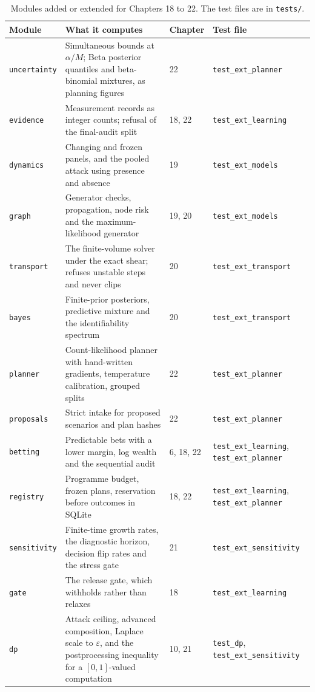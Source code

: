 \begin{table}[ht]
\centering\small
\caption{Modules added or extended for Chapters 18 to 22. The test files are in \texttt{tests/}.}
\label{app:tab-ext}
\begin{tabular}{p{2.1cm}p{6.0cm}p{1.7cm}p{3.0cm}}
\toprule
Module & What it computes & Chapter & Test file\\
\midrule
\texttt{uncertainty} & Simultaneous bounds at $\alpha/M$; Beta posterior quantiles and beta-binomial mixtures, as planning figures & 22 & \texttt{test\_ext\_planner}\\
\texttt{evidence} & Measurement records as integer counts; refusal of the final-audit split & 18, 22 & \texttt{test\_ext\_learning}\\
\texttt{dynamics} & Changing and frozen panels, and the pooled attack using presence and absence & 19 & \texttt{test\_ext\_models}\\
\texttt{graph} & Generator checks, propagation, node risk and the maximum-likelihood generator & 19, 20 & \texttt{test\_ext\_models}\\
\texttt{transport} & The finite-volume solver under the exact shear; refuses unstable steps and never clips & 20 & \texttt{test\_ext\_transport}\\
\texttt{bayes} & Finite-prior posteriors, predictive mixture and the identifiability spectrum & 20 & \texttt{test\_ext\_transport}\\
\texttt{planner} & Count-likelihood planner with hand-written gradients, temperature calibration, grouped splits & 22 & \texttt{test\_ext\_planner}\\
\texttt{proposals} & Strict intake for proposed scenarios and plan hashes & 22 & \texttt{test\_ext\_planner}\\
\texttt{betting} & Predictable bets with a lower margin, log wealth and the sequential audit & 6, 18, 22 & \texttt{test\_ext\_learning}, \texttt{test\_ext\_planner}\\
\texttt{registry} & Programme budget, frozen plans, reservation before outcomes in SQLite & 18, 22 & \texttt{test\_ext\_learning}, \texttt{test\_ext\_planner}\\
\texttt{sensitivity} & Finite-time growth rates, the diagnostic horizon, decision flip rates and the stress gate & 21 & \texttt{test\_ext\_sensitivity}\\
\texttt{gate} & The release gate, which withholds rather than relaxes & 18 & \texttt{test\_ext\_learning}\\
\texttt{dp} & Attack ceiling, advanced composition, Laplace scale to $\varepsilon$, and the postprocessing inequality for a $[0,1]$-valued computation & 10, 21 & \texttt{test\_dp}, \texttt{test\_ext\_sensitivity}\\
\bottomrule
\end{tabular}
\end{table}

